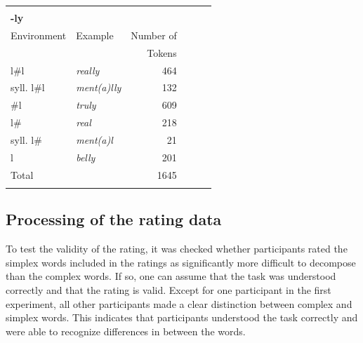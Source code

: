 \begin{table}
{\begin{tabular} {llrllr}
			& & & \\
			\textbf{-ly}&&& & & \\
			\midrule	%
			Environment & Example & Number of & & & \\
						 &  & Tokens & & & \\
			\midrule
			l\#l &\color{lsMidBlue}\textit{really} & 464 & & & \\ 
			syll. l\#l &\color{lsMidBlue}\textit{ment(a)lly} & 132 & & & \\ 
			\#l &\color{lsMidBlue}\textit{truly} & 609& & & \\ 
			l\# &\color{lsMidBlue}\textit{real} & 218& & & \\ 
			syll. l\#&\color{lsMidBlue}\textit{ment(a)l} &21& & &\\ 
			l &\color{lsMidBlue}\textit{belly} & 201& & & \\ 
			\midrule   	
			Total&  &1645 & & & \\ 

			\lspbottomrule
		\end{tabular}
	}
	
\end{table}



\subsection{Processing of the rating data} \label{Processing of the Rating Data}


To test the validity of the rating, it was checked whether participants rated the simplex words included in the ratings as significantly more difficult to decompose than the complex words. If so, one can assume that the task was understood correctly and that the rating is valid. 
Except for one participant in the first experiment, all other participants made a clear distinction between complex and simplex words. This indicates that participants understood the task correctly and were able to recognize differences in  between the words.

